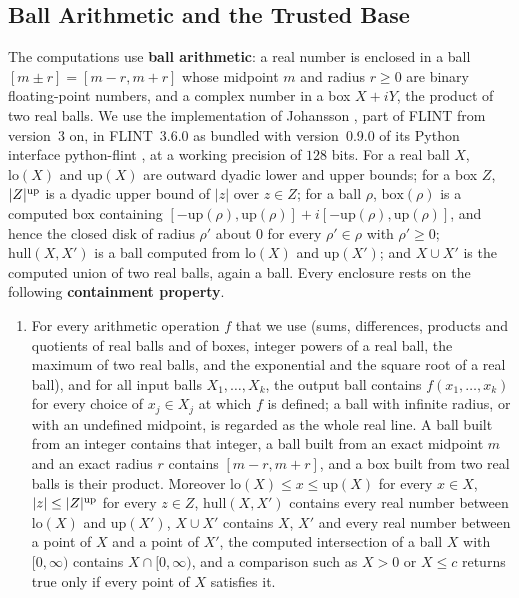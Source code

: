 \subsection{Ball Arithmetic and the Trusted Base}
\label{app:arith}

The computations use \textbf{ball arithmetic}: a real number is enclosed in a
ball $[m\pm r]=[m-r,m+r]$ whose midpoint $m$ and radius $r\ge0$ are binary
floating-point numbers, and a complex number in a box $X+iY$, the product of two
real balls. We use the implementation of Johansson \cite{Johansson2017}, part of
FLINT \cite{FLINT} from version~3 on, in FLINT~3.6.0 as bundled with
version~0.9.0 of its Python interface python-flint \cite{pythonflint}, at a
working precision of $128$ bits. For a real ball $X$, $\mathrm{lo}(X)$ and
$\mathrm{up}(X)$ are outward dyadic lower and upper bounds; for a box $Z$,
$|Z|^{\rm up}$ is a dyadic upper bound of $|z|$ over $z\in Z$; for a ball $\rho$,
$\mathrm{box}(\rho)$ is a computed box containing
$[-\mathrm{up}(\rho),\mathrm{up}(\rho)]+i[-\mathrm{up}(\rho),\mathrm{up}(\rho)]$,
and hence the closed disk of
radius $\rho'$ about $0$ for every $\rho'\in\rho$ with $\rho'\ge0$;
$\mathrm{hull}(X,X')$ is a ball computed from $\mathrm{lo}(X)$ and
$\mathrm{up}(X')$; and $X\cup X'$ is the computed union of two real balls, again
a ball. Every enclosure rests on the following \textbf{containment property}.
\begin{enumerate}[label=\textup{(CP)}, leftmargin=*]
\item For every arithmetic operation $f$ that we use (sums, differences, products
  and quotients of real balls and of boxes, integer powers of a real ball, the
  maximum of two real balls, and the exponential and the square root of a real
  ball), and for all input balls $X_1,\dots,X_k$, the output ball contains
  $f(x_1,\dots,x_k)$ for every choice of $x_j\in X_j$ at which $f$ is defined; a
  ball with infinite radius, or with an undefined midpoint, is regarded as the
  whole real line. A ball built from an integer contains that integer, a ball
  built from an exact midpoint $m$ and an exact radius $r$ contains $[m-r,m+r]$, and a
  box built from two real balls is their product. Moreover
  $\mathrm{lo}(X)\le x\le\mathrm{up}(X)$ for every $x\in X$, $|z|\le|Z|^{\rm up}$ for
  every $z\in Z$, $\mathrm{hull}(X,X')$ contains every real number between
  $\mathrm{lo}(X)$ and $\mathrm{up}(X')$, $X\cup X'$ contains $X$, $X'$ and every
  real number between a point of $X$ and a point of $X'$, the computed
  intersection of a ball $X$ with $[0,\infty)$ contains $X\cap[0,\infty)$, and a
  comparison such as $X>0$ or $X\le c$ returns true only if every point of $X$
  satisfies it.
\end{enumerate}
